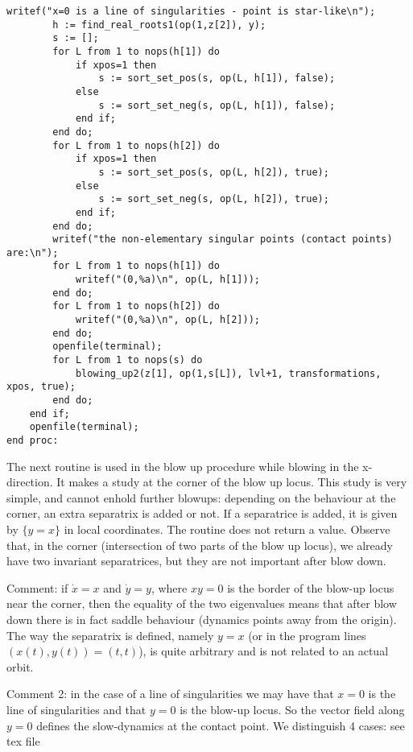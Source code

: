 \documentclass[a4paper,10pt]{article}
\begin{document}
\begin{lstlisting}[name=blowup]
        writef("x=0 is a line of singularities - point is star-like\n");
        h := find_real_roots1(op(1,z[2]), y);
        s := [];
        for L from 1 to nops(h[1]) do
            if xpos=1 then
                s := sort_set_pos(s, op(L, h[1]), false);
            else
                s := sort_set_neg(s, op(L, h[1]), false);
            end if;
        end do;
        for L from 1 to nops(h[2]) do
            if xpos=1 then
                s := sort_set_pos(s, op(L, h[2]), true);
            else
                s := sort_set_neg(s, op(L, h[2]), true);
            end if;
        end do;
        writef("the non-elementary singular points (contact points) are:\n");
        for L from 1 to nops(h[1]) do
            writef("(0,%a)\n", op(L, h[1]));
        end do;
        for L from 1 to nops(h[2]) do
            writef("(0,%a)\n", op(L, h[2]));
        end do;
        openfile(terminal);
        for L from 1 to nops(s) do
            blowing_up2(z[1], op(1,s[L]), lvl+1, transformations, xpos, true);
        end do;
    end if;
    openfile(terminal);
end proc:
\end{lstlisting}

The next routine is used in the blow up procedure while blowing in the x-direction.
It makes a study at the corner of the blow up locus.  This study is very simple,
and cannot enhold further blowups: depending on the behaviour at the corner,
an extra separatrix is added or not.  If a separatrice is added, it is given by $\{y=x\}$ in
local coordinates. The routine does not return a value.  Observe that, in the corner
(intersection of two parts of the blow up locus), we already have two invariant separatrices,
but they are not important after blow down.

Comment: if $\dot{x}=x$ and $\dot{y}=y$, where $xy=0$ is the border of the blow-up locus near the corner, then the equality of the two eigenvalues
means that after blow down there is in fact saddle behaviour (dynamics points away from the origin).  The way the separatrix is defined, namely $y=x$ (or in the program lines $(x(t),y(t))=(t,t)$), is quite arbitrary and is not related to an actual orbit.

Comment 2: in the case of  a line of singularities we may have that ${x=0}$ is the line of singularities and that ${y=0}$ is the blow-up locus.  So the vector field along ${y=0}$ defines the slow-dynamics at the contact point.  We distinguish 4 cases: see tex file
%
\end{document}
